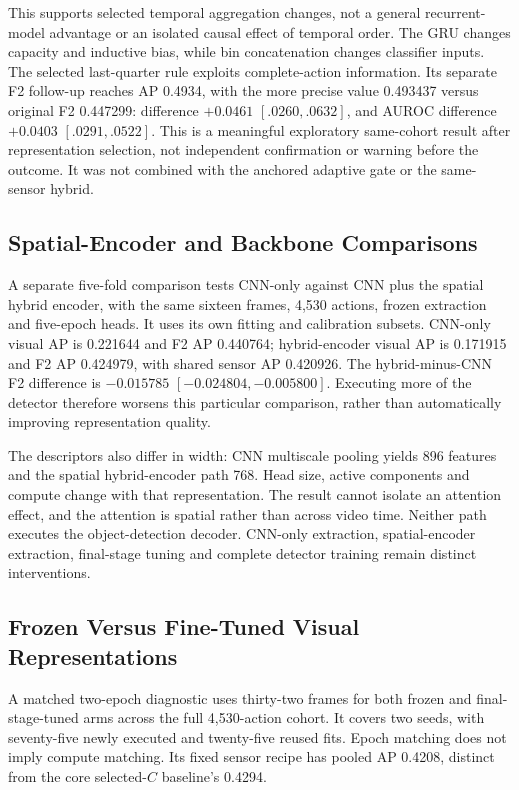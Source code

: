 This supports selected temporal aggregation changes, not a general recurrent-model
advantage or an isolated causal effect of temporal order. The GRU changes capacity and
inductive bias, while bin concatenation changes classifier inputs. The selected
last-quarter rule exploits complete-action information. Its separate F2 follow-up
reaches AP 0.4934, with the more precise value 0.493437 versus original F2 0.447299:
difference $+0.0461$ $[.0260,.0632]$, and AUROC difference $+0.0403$ $[.0291,.0522]$.
This is a meaningful exploratory same-cohort result after representation selection, not
independent confirmation or warning before the outcome. It was not combined with the
anchored adaptive gate or the same-sensor hybrid.

\subsection{Spatial-Encoder and Backbone Comparisons}
A separate five-fold comparison tests CNN-only against CNN plus the spatial hybrid
encoder, with the same sixteen frames, 4,530 actions, frozen extraction and five-epoch
heads. It uses its own fitting and calibration subsets. CNN-only visual AP is 0.221644
and F2 AP 0.440764; hybrid-encoder visual AP is 0.171915 and F2 AP 0.424979, with shared
sensor AP 0.420926. The hybrid-minus-CNN F2 difference is $-0.015785$
$[-0.024804,-0.005800]$. Executing more of the detector therefore worsens this
particular comparison, rather than automatically improving representation
quality.

The descriptors also differ in width: CNN multiscale pooling yields 896 features and the
spatial hybrid-encoder path 768. Head size, active components and compute change with
that representation. The result cannot isolate an attention effect, and the attention is
spatial rather than across video time. Neither path executes the object-detection
decoder. CNN-only extraction, spatial-encoder extraction, final-stage tuning and
complete detector training remain distinct interventions.

\subsection{Frozen Versus Fine-Tuned Visual Representations}
A matched two-epoch diagnostic uses thirty-two frames for both frozen and
final-stage-tuned arms across the full 4,530-action cohort. It covers two seeds, with
seventy-five newly executed and twenty-five reused fits. Epoch matching does not imply
compute matching. Its fixed sensor recipe has pooled AP 0.4208, distinct from the core
selected-$C$ baseline's 0.4294.

